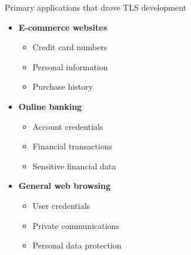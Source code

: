 \ifdefined\PRESENTATION\else\PassOptionsToClass{handout}{beamer}\fi\documentclass[aspectratio=169, lualatex]{beamer}
\begin{document}
\begin{frame}{Primary applications that drove TLS development}
	\begin{itemize}[<+->]
		\item \textbf{E-commerce websites}
		      \begin{itemize}
			      \item Credit card numbers
			      \item Personal information
			      \item Purchase history
		      \end{itemize}
		\item \textbf{Online banking}
		      \begin{itemize}
			      \item Account credentials
			      \item Financial transactions
			      \item Sensitive financial data
		      \end{itemize}
		\item \textbf{General web browsing}
		      \begin{itemize}
			      \item User credentials
			      \item Private communications
			      \item Personal data protection
		      \end{itemize}
	\end{itemize}
\end{frame}
\end{document}
